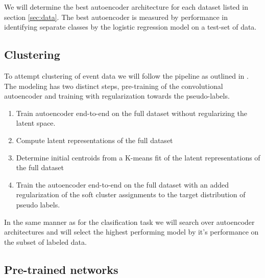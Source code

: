 We will determine the best autoencoder architecture for each dataset listed in section \ref{sec:data}. The best autoencoder is measured by performance in identifying separate classes by the logistic regression model on a test-set of data. 

\subsection{Clustering}

To attempt clustering of event data we will follow the pipeline as outlined in \citet{Guo2017}. The modeling has two distinct steps, pre-training of the convolutional autoencoder and training with regularization towards the pseudo-labels. 

\begin{enumerate}
\item Train autoencoder end-to-end on the full dataset without regularizing the latent space. 
\item Compute latent representations of the full dataset
\item Determine initial centroids from a K-means fit of the latent representations of the full dataset
\item Train the autoencoder end-to-end on the full dataset with an added regularization of the soft cluster assignments to the target distribution of pseudo labels.
\end{enumerate}

In the same manner as for the clasification task we will search over autoencoder architectures and will select the highest performing model by it's performance on the subset of labeled data.

\subsection{Pre-trained networks}


